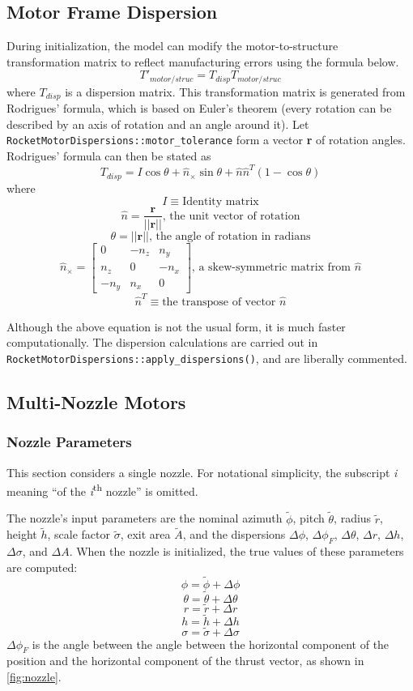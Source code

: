 \documentclass[11pt,fleqn]{report}
\begin{document}
\subsection{Motor Frame Dispersion}\label{MFD}
\par During initialization, the model can modify the motor-to-structure transformation matrix to reflect manufacturing errors using the formula below.
$$T'_{motor/struc} = T_{disp}T_{motor/struc}$$
where $T_{disp}$ is a dispersion matrix.  This transformation matrix is generated from Rodrigues' formula, which is based on Euler's theorem (every rotation can be described by an axis of rotation and an angle around it).  Let \verb|RocketMotorDispersions::motor_tolerance| form a vector \textbf{r} of rotation angles.  Rodrigues' formula can then be stated as 
$$T_{disp} = I \cos\theta + \hat{n}_\times \sin\theta + \hat{n}\hat{n}^T (1 - \cos\theta)$$
where 
$$I \equiv  \mbox{Identity matrix} $$
$$\hat{n} =  \frac{\mathbf{r}}{\mathbf{||r||}}\mbox{, the unit vector of rotation}$$
$$\theta = \mathbf{||r||}\mbox{, the angle of rotation in radians}$$
$$\hat{n}_\times =     \left[ \begin{array}{ccc}
0 & -n_z & n_y \\ n_z & 0 & -n_x \\ -n_y & n_x & 0 \end{array} \right] \mbox{, a skew-symmetric matrix from } \hat{n}$$
$$\hat{n}^T \equiv \mbox{the transpose of vector }\hat{n}$$


Although the above equation is not the usual form, it is much faster computationally.  The dispersion calculations are carried out in \verb|RocketMotorDispersions::apply_dispersions()|, and are liberally commented.

\subsection{Multi-Nozzle Motors}
\subsubsection{Nozzle Parameters}\label{nozzles}
\par This section considers a single nozzle. For notational simplicity, the subscript \textit{i} meaning ``of the \textit{i}\textsuperscript{th} nozzle'' is omitted.
\par The nozzle's input parameters are the nominal azimuth $\tilde{\phi}$, pitch $\tilde{\theta}$, radius $\tilde{r}$, height $\tilde{h}$, scale factor $\tilde{\sigma}$, exit area $\tilde{A}$, and the dispersions $\Delta\phi$, $\Delta\phi_F$, $\Delta\theta$, $\Delta r$, $\Delta h$, $\Delta \sigma$, and $\Delta A$. When the nozzle is initialized, the true values of these parameters are computed:
$$\phi = \tilde{\phi} + \Delta\phi$$
$$\theta = \tilde{\theta} + \Delta\theta$$
$$r = \tilde{r} + \Delta r$$
$$h = \tilde{h} + \Delta h$$
$$\sigma = \tilde{\sigma} + \Delta \sigma$$
$\Delta\phi_F$ is the angle between the angle between the horizontal component of the position and the horizontal component of the thrust vector, as shown in \ref{fig:nozzle}.
\end{document}
